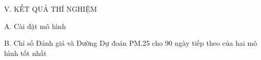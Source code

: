 \begin{center}
    V. KẾT QUẢ THÍ NGHIỆM
\end{center}
A. Cài đặt mô hình

% 
% 
% 
% 
% 
% 
% 
% 
% 
% 
B. Chỉ số Đánh giá và Đường Dự đoán PM.25 cho 90 ngày tiếp theo của hai mô hình tốt nhất



% 
% 
% 
% 
% 
% 
% 
% 
% 
% 



